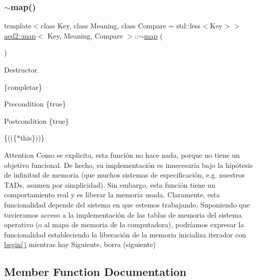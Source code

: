 \subsubsection{\texorpdfstring{$\sim$map()}{~map()}\hspace{0.1cm}{\footnotesize\ttfamily [2/2]}}
{\footnotesize\ttfamily template$<$class Key, class Meaning, class Compare = std\+::less$<$\+Key$>$$>$ \\
\hyperlink{classaed2_1_1map}{aed2\+::map}$<$ Key, Meaning, Compare $>$\+::$\sim$\hyperlink{classaed2_1_1map}{map} (\begin{DoxyParamCaption}{ }\end{DoxyParamCaption})\hspace{0.3cm}{\ttfamily [inline]}}



Destructor. 

\{completar\}

\begin{DoxyPrecond}{Precondition}
\{true\} 
\end{DoxyPrecond}
\begin{DoxyPostcond}{Postcondition}
\{true\}
\end{DoxyPostcond}
\{((\{$\ast$this\}))\}

\begin{DoxyAttention}{Attention}
Como se explicita, esta función no hace nada, porque no tiene un objetivo funcional. De hecho, su implementación es innecesaria bajo la hipótesis de infinitud de memoria (que muchos sistemas de especificación, e.\+g. nuestros T\+A\+Ds, asumen por simplicidad). Sin embargo, esta función tiene un comportamiento real y es liberar la memoria usada. Claramente, esta funcionalidad depende del sistema en que estemos trabajando. Suponiendo que tuvieramos acceso a la implementación de las tablas de memoria del sistema operativo (o al mapa de memoria de la computadora), podríamos expresar la funcionalidad estableciendo la liberación de la memoria inicializa iterador con \hyperlink{classaed2_1_1map_a58a95705d54b3dda7f775ce5a22225cb}{begin()} mientras hay Siguiente, borra (siguiente) 
\end{DoxyAttention}


\subsection{Member Function Documentation}
\mbox{\label{classaed2_1_1map_a579c9179b42175c23a1013ac7f1b876c}} 
